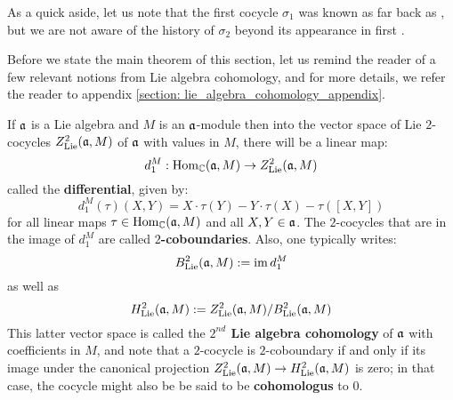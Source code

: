         As a quick aside, let us note that the first cocycle $\sigma_1$ was known as far back as \cite{moody_rao_n_toroidal_vertex_representations}, but we are not aware of the history of $\sigma_2$ beyond its appearance in first \cite{billig_energy_momentum_tensor}.

        \begin{remark}
            Before we state the main theorem of this section, let us remind the reader of a few relevant notions from Lie algebra cohomology, and for more details, we refer the reader to appendix \ref{section: lie_algebra_cohomology_appendix}.
            
            If $\mathfrak{a}$ is a Lie algebra and $M$ is an $\mathfrak{a}$-module then into the vector space of Lie $2$-cocycles $Z^2_{\mathrm{Lie}}(\mathfrak{a}, M)$ of $\mathfrak{a}$ with values in $M$, there will be a linear map:
                $$d_1^M: \mathrm{Hom}_{\mathbb{C}}(\mathfrak{a}, M) \to Z^2_{\mathrm{Lie}}(\mathfrak{a}, M)$$
            called the \textbf{differential}, given by:
                $$d_1^M(\tau)(X, Y) = X \cdot \tau(Y) - Y \cdot \tau(X) - \tau([X, Y])$$
            for all linear maps $\tau \in \mathrm{Hom}_{\mathbb{C}}(\mathfrak{a}, M)$ and all $X, Y \in \mathfrak{a}$. The $2$-cocycles that are in the image of $d_1^M$ are called \textbf{$2$-coboundaries}. Also, one typically writes:
                $$B^2_{\mathrm{Lie}}(\mathfrak{a}, M) := \operatorname{im} d_1^M$$
            as well as
                $$H^2_{\mathrm{Lie}}(\mathfrak{a}, M) := Z^2_{\mathrm{Lie}}(\mathfrak{a}, M)/B^2_{\mathrm{Lie}}(\mathfrak{a}, M)$$
            This latter vector space is called the \textbf{$2^{nd}$ Lie algebra cohomology} of $\mathfrak{a}$ with coefficients in $M$, and note that a $2$-cocycle is $2$-coboundary if and only if its image under the canonical projection $Z^2_{\mathrm{Lie}}(\mathfrak{a}, M) \to H^2_{\mathrm{Lie}}(\mathfrak{a}, M)$ is zero; in that case, the cocycle might also be be said to be \textbf{cohomologus} to $0$.
        \end{remark}

